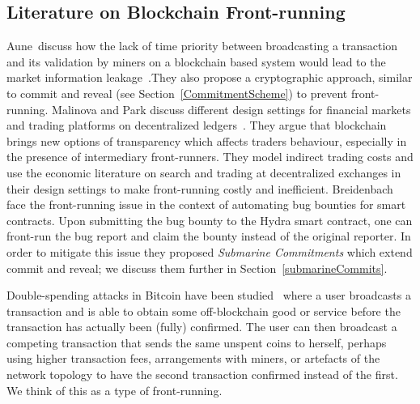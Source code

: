 
\subsection{Literature on Blockchain Front-running}

Aune~\etal discuss how the lack of time priority between broadcasting a transaction and its validation by miners on a blockchain based system would lead to the market information leakage~\cite{aune2017footprints}.They also propose a cryptographic approach, similar to commit and reveal (see Section~\ref{CommitmentScheme}) to prevent front-running.
Malinova and Park discuss different design settings for financial markets and trading platforms on decentralized ledgers~\cite{malinova2017market}. They argue that blockchain brings new options of transparency which affects traders behaviour, especially in the presence of intermediary front-runners. They model indirect trading costs and use the economic literature on search and trading at decentralized exchanges in their design settings to make front-running costly and inefficient. Breidenbach~\etal~\cite{breidenbach2018enter} face the front-running issue in the context of automating bug bounties for smart contracts. Upon submitting the bug bounty to the Hydra smart contract, one can front-run the bug report and claim the bounty instead of the original reporter. In order to mitigate this issue they proposed \textit{Submarine Commitments} which extend commit and reveal; we discuss them further in Section~\ref{submarineCommits}.

Double-spending attacks in Bitcoin have been studied~\cite{bamert2013have, karame2012double} where a user broadcasts a transaction and is able to obtain some off-blockchain good or service before the transaction has actually been (fully) confirmed. The user can then broadcast a competing transaction that sends the same unspent coins to herself, perhaps using higher transaction fees, arrangements with miners, or artefacts of the network topology to have the second transaction confirmed instead of the first. We think of this as a type of front-running.

